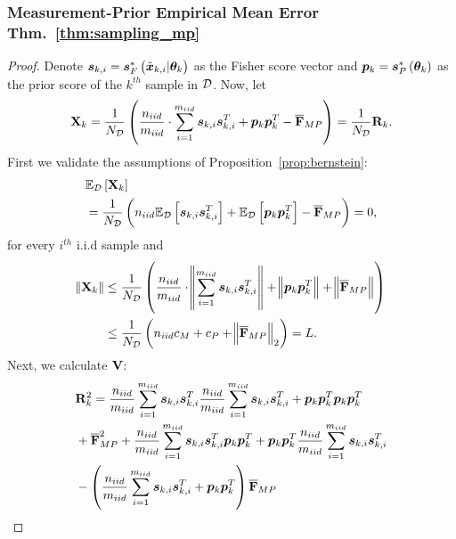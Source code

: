 \subsubsection{%
Measurement-Prior Empirical Mean Error {Thm.~\ref{thm:sampling_mp}}}
\begin{proof}
  Denote {$\bm{s}_{k,i}=\bm{s}_{F}^*\left(\tilde{\bm{x}}_{k,i}|\bm{\theta}_k\right)$} as the Fisher score  vector  and $\bm{p}_k=\bm{s}_{P}^*\left(\bm{\theta}_k\right)$ as the prior score of the $k^{th}$ sample in $\mathcal{D}$.
    Now, let $$\mathbf{X}_k=\frac{1}{N_{\mathcal{D}}}\left(\frac{n_{iid}}{m_{iid}}\cdot\sum_{i=1}^{m_{iid}} \bm{s}_{k,i}\bm{s}_{k,i}^T+ \bm{p}_k\bm{p}_k^T-\overline{\mathbf{F}}_{MP}\right)=\frac{1}{N_{\mathcal{D}}}\mathbf{R}_k.$$
    First we validate the assumptions of {Proposition~\ref{prop:bernstein}}:
    \begin{align*}
        &\mathbb{E}_{\mathcal{D}}\left[\mathbf{X}_k\right]\nonumber\\
        &=\frac{1}{N_{\mathcal{D}}}\left(n_{iid}\mathbb{E}_{\mathcal{D}}\left[\bm{s}_{k,i}\bm{s}_{k,i}^T\right]+\mathbb{E}_{\mathcal{D}}\left[\bm{p}_k\bm{p}_k^T\right]-\overline{\mathbf{F}}_{MP}\right)=0,
    \end{align*}
    {for every $i^{th}$ i.i.d sample} and 
    \begin{align}\label{eq:l_value_lik_prior}
        \norm{\mathbf{X}_k}&\leq\frac{1}{N_{\mathcal{D}}}\left(\frac{n_{iid}}{m_{iid}}\cdot{\norm{\sum_{i=1}^{m_{iid}}\bm{s}_{k,i}\bm{s}_{k,i}^T}}+\norm{\bm{p}_k\bm{p}_k^T}+\norm{\overline{\mathbf{F}}_{MP}}\right)\nonumber\\
        &\leq \frac{1}{N_{\mathcal{D}}}\left(n_{iid} c_M+c_P+\norm{\overline{\mathbf{F}}_{MP}}_2\right)=L.
    \end{align}
   Next, we calculate $\mathbf{V}$:
    \begin{align*}
        &\matsym{R}^2_k={\frac{\niideval}{\niiddata}\sum_{i=1}^{\niiddata}\vectorsym{s}_{k,i}\vectorsym{s}_{k,i}^T}{\frac{\niideval}{\niiddata}\sum_{i=1}^{\niiddata}\vectorsym{s}_{k,i}\vectorsym{s}_{k,i}^T}+\vectorsym{p}_k\vectorsym{p}_k^T\vectorsym{p}_k\vectorsym{p}_k^T\nonumber\\
        &+\lbfimlp^2+{\frac{\niideval}{\niiddata}\sum_{i=1}^{\niiddata}\vectorsym{s}_{k,i}\vectorsym{s}_{k,i}^T}\vectorsym{p}_k\vectorsym{p}_k^T+\vectorsym{p}_k\vectorsym{p}_k^T{\frac{\niideval}{\niiddata}\sum_{i=1}^{\niiddata}\vectorsym{s}_{k,i}\vectorsym{s}_{k,i}^T}\\
        &-\brackets{{\frac{\niideval}{\niiddata}\sum_{i=1}^{\niiddata}\vectorsym{s}_{k,i}\vectorsym{s}_{k,i}^T}+\vectorsym{p}_k\vectorsym{p}_k^T}\lbfimlp\\

\end{align*}
\end{proof}
